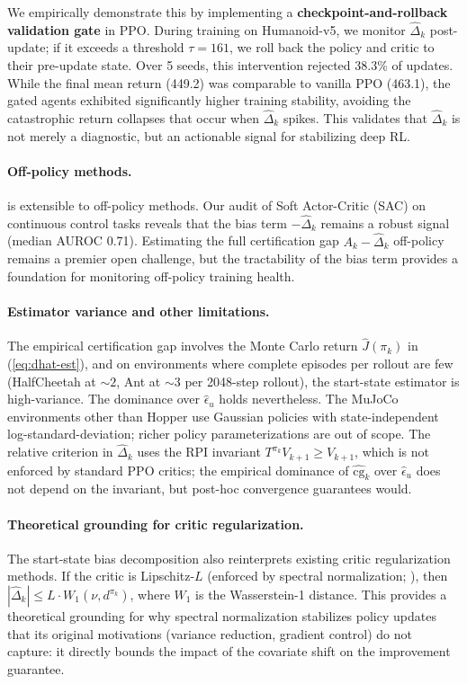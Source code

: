 \documentclass[11pt]{article}
\begin{document}
We empirically demonstrate this by implementing a \textbf{checkpoint-and-rollback validation gate} in PPO. During training on Humanoid-v5, we monitor $\hat\Delta_k$ post-update; if it exceeds a threshold $\tau=161$, we roll back the policy and critic to their pre-update state. Over 5 seeds, this intervention rejected 38.3\% of updates. While the final mean return (449.2) was comparable to vanilla PPO (463.1), the gated agents exhibited significantly higher training stability, avoiding the catastrophic return collapses that occur when $\hat\Delta_k$ spikes. This validates that $\hat\Delta_k$ is not merely a diagnostic, but an actionable signal for stabilizing deep RL.

\paragraph{Off-policy methods.}
 is extensible to off-policy methods. Our audit of Soft Actor-Critic (SAC) \citep{haarnoja2018soft} on continuous control tasks reveals that the bias term $-\hat\Delta_k$ remains a robust signal (median AUROC 0.71). Estimating the full certification gap $A_k - \hat\Delta_k$ off-policy remains a premier open challenge, but the tractability of the bias term provides a foundation for monitoring off-policy training health.

\paragraph{Estimator variance and other limitations.}
The empirical certification gap involves the Monte Carlo return $\widehat{J}(\pi_k)$ in (\ref{eq:dhat-est}), and on environments where complete episodes per rollout are few (HalfCheetah at $\sim 2$, Ant at $\sim 3$ per 2048-step rollout), the start-state estimator is high-variance. The dominance over $\widehat\epsilon_u$ holds nevertheless. The MuJoCo environments other than Hopper use Gaussian policies with state-independent log-standard-deviation; richer policy parameterizations are out of scope. The relative criterion in $\hat\Delta_k$ uses the RPI invariant $T^{\pi_k} V_{k+1} \ge V_{k+1}$, which is not enforced by standard PPO critics; the empirical dominance of $\widehat{\mathrm{cg}}_k$ over $\widehat\epsilon_u$ does not depend on the invariant, but post-hoc convergence guarantees would.

\paragraph{Theoretical grounding for critic regularization.}
The start-state bias decomposition also reinterprets existing critic regularization methods. If the critic is Lipschitz-$L$ (enforced by spectral normalization; \citealp{miyato2018spectral,bjorck2021spectralnorm}), then $|\hat\Delta_k| \le L \cdot W_1(\nu, d^{\pi_k})$, where $W_1$ is the Wasserstein-1 distance. This provides a theoretical grounding for why spectral normalization stabilizes policy updates that its original motivations (variance reduction, gradient control) do not capture: it directly bounds the impact of the covariate shift on the improvement guarantee.
\end{document}
